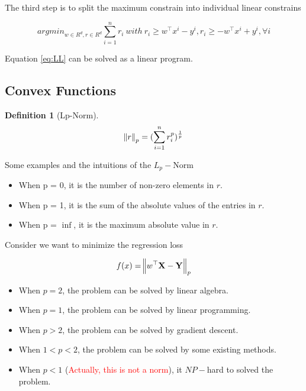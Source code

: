\documentclass{article}
\theoremstyle{definition}
\newtheorem{definition}{Definition}[section]
\theoremstyle{remark}
\newcommand{\red}[1]{\textcolor{red}{#1}}
\begin{document}
The third step is to split the maximum constrain into individual linear constrains

\begin{equation}
    \label{eq:LL}
    argmin_{w \in R^{d}, r \in R^{d}} \sum^{n}_{i=1} r_{i}\ with\ r_{i} \geq w^{\top} x^{i} - y^{i}, r_i \geq -w^{\top} x^{i} + y^{i}, \forall i
\end{equation}

Equation \ref{eq:LL} can be solved as a linear program.

\subsection{Convex Functions}

\begin{definition}[Lp-Norm]
\begin{equation}
    \norm{r}_{p} = (\sum^{n}_{i=1} r_{i}^{p})^{\frac{1}{p}}
\end{equation}
\end{definition}

Some examples and the intuitions of the $L_{p}-$Norm
\begin{itemize}
    \item When p = 0, it is the number of non-zero elements in $r$.
    \item When p = 1, it is the sum of the absolute values of the entries in $r$.
    \item When p = $\inf$, it is the maximum absolute value in $r$.
\end{itemize}

Consider we want to minimize the regression loss

\begin{equation}
    f(x) = \norm{w^{\top}\mathbf{X} - \mathbf{Y}}_{p}
\end{equation}

\begin{itemize}
    \item When $p=2$, the problem can be solved by linear algebra.
    \item When $p=1$, the problem can be solved by linear programming.
    \item When $p > 2$, the problem can be solved by gradient descent.
    \item When $1 < p < 2$, the problem can be solved by some existing methods.
    \item When $p < 1$ (\red{Actually, this is not a norm}), it $NP-$hard to solved the problem.
\end{itemize}
\end{document}
